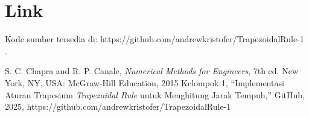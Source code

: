 \documentclass[conference]{IEEEtran}
\begin{document}
\section{Link}
Kode sumber tersedia di: https://github.com/andrewkristofer/TrapezoidalRule-1 \cite{b2}.

\begin{thebibliography}{00}
 S. C. Chapra and R. P. Canale, \textit{Numerical Methods for Engineers}, 7th ed. New York, NY, USA: McGraw-Hill Education, 2015
 Kelompok 1, ``Implementasi Aturan Trapesium \textit{Trapezoidal Rule} untuk Menghitung Jarak Tempuh,'' GitHub, 2025, https://github.com/andrewkristofer/TrapezoidalRule-1 %
\end{thebibliography}
\end{document}
